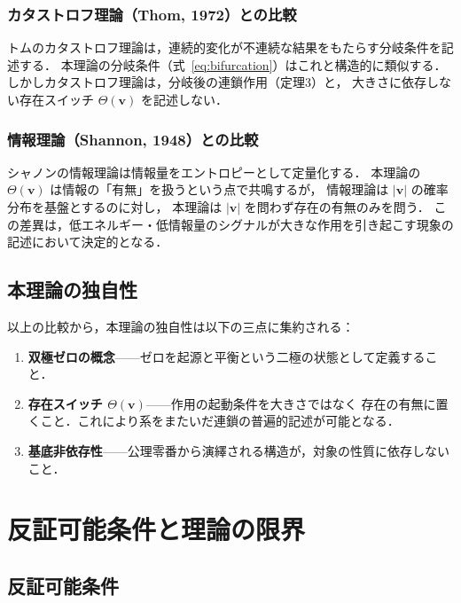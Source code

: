 \documentclass[12pt, a4paper]{article}
\theoremstyle{definition}
\newcommand{\Switch}{\Theta}
\begin{document}
\subsubsection{カタストロフ理論（Thom, 1972）との比較}

トムのカタストロフ理論は，連続的変化が不連続な結果をもたらす分岐条件を記述する．
本理論の分岐条件（式~\eqref{eq:bifurcation}）はこれと構造的に類似する．
しかしカタストロフ理論は，分岐後の連鎖作用（定理3）と，
大きさに依存しない存在スイッチ $\Switch(\mathbf{v})$ を記述しない．

\subsubsection{情報理論（Shannon, 1948）との比較}

シャノンの情報理論は情報量をエントロピーとして定量化する．
本理論の $\Switch(\mathbf{v})$ は情報の「有無」を扱うという点で共鳴するが，
情報理論は $|\mathbf{v}|$ の確率分布を基盤とするのに対し，
本理論は $|\mathbf{v}|$ を問わず存在の有無のみを問う．
この差異は，低エネルギー・低情報量のシグナルが大きな作用を引き起こす現象の
記述において決定的となる．

\subsection{本理論の独自性}

以上の比較から，本理論の独自性は以下の三点に集約される：

\begin{enumerate}
  \item \textbf{双極ゼロの概念}——ゼロを起源と平衡という二極の状態として定義すること．
  \item \textbf{存在スイッチ $\Switch(\mathbf{v})$}——作用の起動条件を大きさではなく
        存在の有無に置くこと．これにより系をまたいだ連鎖の普遍的記述が可能となる．
  \item \textbf{基底非依存性}——公理零番から演繹される構造が，対象の性質に依存しないこと．
\end{enumerate}

\section{反証可能条件と理論の限界}

\subsection{反証可能条件}
\end{document}

